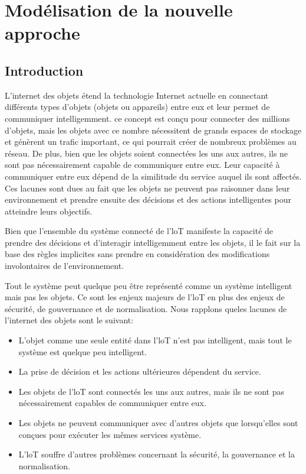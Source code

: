 

\chapter{Modélisation de la nouvelle approche}

\section{Introduction}
L’internet des objets étend la technologie Internet actuelle en connectant différents types d'objets (objets ou appareils) entre eux et leur permet de communiquer intelligemment. ce concept est conçu pour connecter des millions d’objets, mais les objets avec ce nombre nécessitent de grands espaces de stockage et génèrent un trafic important, ce qui pourrait créer de nombreux problèmes au réseau. De plus, bien que les objets soient connectées les uns aux autres, ils ne sont pas nécessairement capable de communiquer entre eux. Leur capacité à communiquer entre eux dépend de la similitude du service auquel ils sont affectés. Ces lacunes sont dues au fait que les objets ne peuvent pas raisonner dans leur environnement et prendre ensuite des décisions et des actions intelligentes pour atteindre leurs objectifs.

Bien que l'ensemble du système connecté de l’loT manifeste la capacité de prendre des décisions et d'interagir intelligemment entre les objets, il le fait sur la base des règles implicites sans prendre en considération des modifications involontaires de l'environnement.


Tout le système peut quelque peu être représenté comme un système intelligent mais pas les objets. Ce sont les enjeux majeurs de l’loT en plus des enjeux de sécurité, de gouvernance et de normalisation. Nous rapplons queles lacunes de l'internet des objets sont le suivant: 

\begin{itemize}
    \item L’objet comme une seule entité dans l’loT n'est pas intelligent, mais tout le système est quelque peu intelligent.
    \item La prise de décision et les actions ultérieures dépendent du service.
    \item Les objets de l’loT sont connectés les uns aux autres, mais ils ne sont pas nécessairement capables de communiquer entre eux.
    \item Les objets ne peuvent communiquer avec d'autres objets que lorsqu'elles sont conçues pour exécuter les mêmes services système.
    \item L’loT souffre d'autres problèmes concernant la sécurité, la gouvernance et la normalisation.

\end{itemize}

